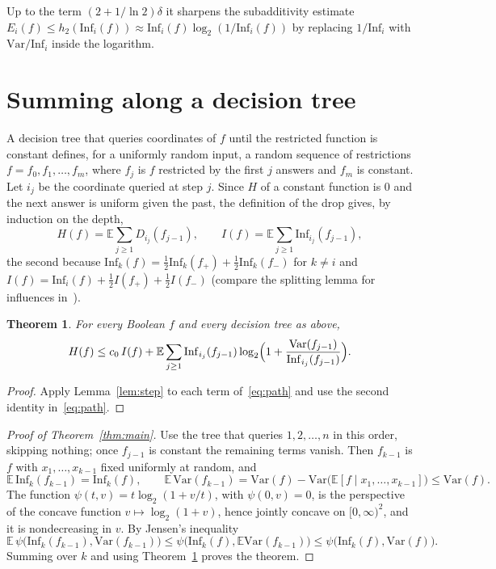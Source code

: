 \documentclass[11pt]{amsart}
\newtheorem{theorem}{Theorem}
\theoremstyle{remark}
\newcommand{\Inf}{\mathrm{Inf}}
\newcommand{\Var}{\mathrm{Var}}
\newcommand{\E}{\mathbb{E}}
\begin{document}
Up to the term $(2+1/\ln2)\delta$ it
sharpens the subadditivity estimate $E_i(f)\le h_2(\Inf_i(f))\approx\Inf_i(f)\log_2(1/\Inf_i(f))$ by replacing $1/\Inf_i$ with $\Var/\Inf_i$ inside the
logarithm.

\section{Summing along a decision tree}\label{sec:tree}

A decision tree that queries coordinates of $f$ until the restricted function is constant defines, for a uniformly
random input, a random sequence of restrictions $f=f_0,f_1,\dots,f_m$, where $f_j$ is $f$ restricted by the first $j$
answers and $f_m$ is constant. Let $i_j$ be the coordinate queried at step $j$. Since $H$ of a constant function is
$0$ and the next answer is uniform given the past, the definition of the drop gives, by induction on the depth,
\begin{equation}\label{eq:path}
H(f)=\E\sum_{j\ge1}D_{i_j}(f_{j-1}),\qquad I(f)=\E\sum_{j\ge1}\Inf_{i_j}(f_{j-1}),
\end{equation}
the second because $\Inf_k(f)=\tfrac12\Inf_k(f_+)+\tfrac12\Inf_k(f_-)$ for $k\ne i$ and $I(f)=\Inf_i(f)+\tfrac12I(f_+)+\tfrac12I(f_-)$
(compare the splitting lemma for influences in~\cite[Section 2]{GMP}).

\begin{theorem}\label{thm:adaptive}
For every Boolean $f$ and every decision tree as above,
\[
H(f)\le c_0\,I(f)+\E\sum_{j\ge1}\Inf_{i_j}(f_{j-1})\log_2\Bigl(1+\frac{\Var(f_{j-1})}{\Inf_{i_j}(f_{j-1})}\Bigr).
\]
\end{theorem}

\begin{proof}
Apply Lemma~\ref{lem:step} to each term of~\eqref{eq:path} and use the second identity in~\eqref{eq:path}.
\end{proof}

\begin{proof}[Proof of Theorem~\ref{thm:main}]
Use the tree that queries $1,2,\dots,n$ in this order, skipping nothing; once $f_{j-1}$ is constant the remaining
terms vanish. Then $f_{k-1}$ is $f$ with $x_1,\dots,x_{k-1}$ fixed uniformly at random, and
\[
\E\,\Inf_k(f_{k-1})=\Inf_k(f),\qquad \E\,\Var(f_{k-1})=\Var(f)-\Var\bigl(\E[f\mid x_1,\dots,x_{k-1}]\bigr)\le\Var(f).
\]
The function $\psi(t,v)=t\log_2(1+v/t)$, with $\psi(0,v)=0$, is the perspective of the concave function
$v\mapsto\log_2(1+v)$, hence jointly concave on $[0,\infty)^2$, and it is nondecreasing in $v$. By Jensen's inequality
\[
\E\,\psi\bigl(\Inf_k(f_{k-1}),\Var(f_{k-1})\bigr)\le\psi\bigl(\Inf_k(f),\E\Var(f_{k-1})\bigr)\le\psi\bigl(\Inf_k(f),\Var(f)\bigr).
\]
Summing over $k$ and using Theorem~\ref{thm:adaptive} proves the theorem.
\end{proof}
\end{document}
